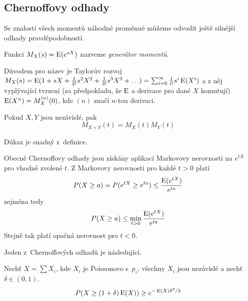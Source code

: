 {\subsection{Chernoffovy odhady}


Se znalostí všech momentů náhodné proměnné můžeme odvodit ještě silnější
odhady pravděpodobností.

\begin{definition}
    Funkci $M_X(s) = \operatorname{E}(e^{s X})$ nazveme {\em generátor momentů}.
\end{definition}

Důvodem pro název je Taylorův rozvoj
$M_X(s)
= \operatorname{E}( 1 + sX + \frac{1}{2!}s^2 X^2 + \frac{1}{3!}s^3 X^3 + \ldots )
= \sum_{i = 0}^{\infty} \frac{1}{i!} s^i \operatorname{E} (X^i)$
a z něj vyplývající tvrzení (za předpokladu, že $\operatorname{E}$ a derivace
pro dané $X$ komutují) $\operatorname{E}(X^n) = M^{(n)}_X(0)$, kde $(n)$ značí $n$-tou
derivaci.

\begin{theorem}
    Pokud $X, Y$ jsou nezávislé, pak
    \[
        M_{X+Y}(t) = M_X(t) M_Y(t)
    \]
\end{theorem}

Důkaz je snadný z~definice.

\begin{definition}
Obecně Chernoffovy odhady jsou získány aplikací Markovovy nerovnosti na
$e^{tX}$ pro vhodně zvolené $t$. Z Markovovy nerovnosti pro každé $t >
0$ platí
\[
    P(X \geq a) = P(e^{tX} \geq e^{ta}) \leq \frac{\operatorname{E}(e^{tX})}{e^{ta}}
\]
zejména tedy
\[
    P(X \geq a) \leq \min_{t > 0} \frac{\operatorname{E}(e^{tX})}{e^{ta}}
\]
Stejně tak platí opačná nerovnost pro $t < 0$.
\end{definition}


Jeden z~Chernoffových odhadů je následující.

\begin{theorem}
    Nechť $X = \sum X_i$, kde $X_i$ je Poissonovo s~$p_i$,
    všechny $X_i$ jsou nezávislé a nechť $\delta \in (0,1)$.
    \[
        P(X \geq (1 + \delta) \operatorname{E}(X)) \geq e^{- \operatorname{E}(X) \delta^2 / 3}
    \]
\end{theorem}

}
